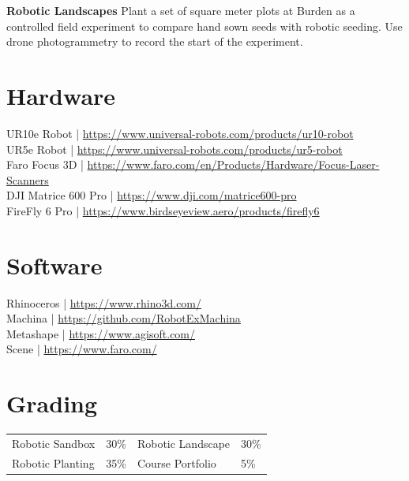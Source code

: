 \documentclass[11pt,article,oneside]{memoir}
\begin{document}
\noindent \textbf{Robotic Landscapes}
Plant a set of square meter plots at Burden
as a controlled field experiment
to compare hand sown seeds with robotic seeding.
Use drone photogrammetry
to record the start of the experiment.
\\

\section{Hardware}
UR10e Robot | \url{https://www.universal-robots.com/products/ur10-robot}\\
UR5e Robot | \url{https://www.universal-robots.com/products/ur5-robot}\\
Faro Focus 3D | \url{https://www.faro.com/en/Products/Hardware/Focus-Laser-Scanners}\\
DJI Matrice 600 Pro | \url{https://www.dji.com/matrice600-pro}\\
FireFly 6 Pro | \url{https://www.birdseyeview.aero/products/firefly6}\\

\section{Software}
Rhinoceros | \url{https://www.rhino3d.com/}\\
Machina | \url{https://github.com/RobotExMachina}\\
Metashape | \url{https://www.agisoft.com/}\\
Scene | \url{https://www.faro.com/}\\

\section{Grading}
%
\begin{table}[H]
\begin{tabular}{l r @{\hskip 2cm} l @{\hskip 0.5cm} l}
%
Robotic Sandbox & 30\% & Robotic Landscape & 30\% \\
Robotic Planting & 35\%  & Course Portfolio & 5\% \\
%
\end{tabular}
\end{table}
\end{document}
